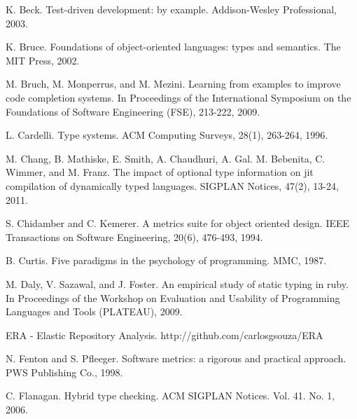 \documentclass[msc]{ppgccufmg}
\begin{document}

\renewcommand{\bibfont}{\normalsize}
\begin{thebibliography}{}


K. Beck.  Test-driven development: by example. Addison-Wesley Professional, 2003.

K. Bruce. Foundations of object-oriented languages: types and semantics. The MIT Press, 2002.

M. Bruch, M. Monperrus, and M. Mezini. Learning from examples to improve code completion systems. In Proceedings of the International Symposium on the Foundations of Software Engineering (FSE), 213-222, 2009.

L. Cardelli. Type systems. ACM Computing Surveys, 28(1), 263-264, 1996.

M. Chang, B. Mathiske, E. Smith, A. Chaudhuri, A. Gal. M. Bebenita, C. Wimmer, and M. Franz. The impact of optional type information on jit compilation of dynamically typed languages. SIGPLAN Notices, 47(2), 13-24, 2011.

S. Chidamber and C. Kemerer. A metrics suite for object oriented design. IEEE Transactions on Software Engineering, 20(6), 476-493, 1994.


B. Curtis. Five paradigms in the psychology of programming. MMC, 1987.

M. Daly, V. Sazawal, and  J. Foster. An empirical study of static typing in ruby. In Proceedings of the Workshop on Evaluation and Usability of Programming Languages and Tools (PLATEAU), 2009.

ERA - Elastic Repository Analysis. http://github.com/carlosgsouza/ERA

N. Fenton and S. Pfleeger. Software metrics: a rigorous and practical approach. PWS Publishing Co., 1998.

C. Flanagan. Hybrid type checking. ACM SIGPLAN Notices. Vol. 41. No. 1, 2006.


\end{thebibliography}
\end{document}
